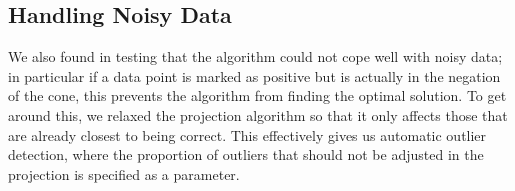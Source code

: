\subsection{Handling Noisy Data}

We also found in testing that the algorithm could not cope well with
noisy data; in particular if a data point is marked as positive but is
actually in the negation of the cone, this prevents the algorithm from
finding the optimal solution. To get around this, we relaxed the
projection algorithm so that it only affects those that are already
closest to being correct. This effectively gives us automatic outlier
detection, where the proportion of outliers that should not be
adjusted in the projection is specified as a parameter.

